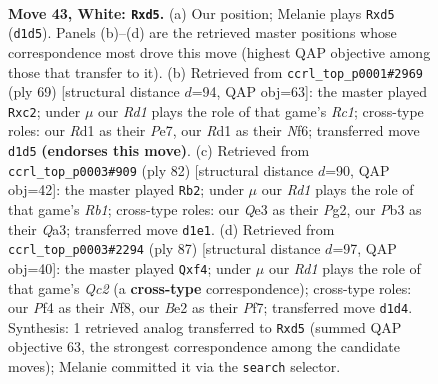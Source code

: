 \documentclass[11pt]{article}
\begin{document}
\clearpage

\begin{figure}[p]\centering
\begin{subfigure}{0.46\textwidth}\centering
\resizebox{\linewidth}{!}{%
\newchessgame
\chessboard[
  setfen={rnb2q2/1p4k1/4p3/p2r1pNp/PnN2P2/1P2Q1P1/4B1KP/3R3R w - - 5 43},
  showmover=false,
  pgfstyle=straightmove, color=movearrow, markmove={d1-d5}
]}
\caption{}
\end{subfigure}\hfill
\begin{subfigure}{0.46\textwidth}\centering
\resizebox{\linewidth}{!}{%
\newchessgame
\chessboard[
  setfen={2r1r3/3bp1k1/q2p1np1/1p1N3p/1P2P3/P5PP/2RQ2BK/2R5 b - - 1 35},
  showmover=false,
  pgfstyle=straightmove, color=movearrow, markmove={c8-c2}
]}
\caption{}
\end{subfigure}
\\[4pt]
\begin{subfigure}{0.46\textwidth}\centering
\resizebox{\linewidth}{!}{%
\newchessgame
\chessboard[
  setfen={1r1r2k1/p2q1p2/2b1n1p1/P2p4/2pP3p/Q1N1P2P/2B2PP1/1R2R1K1 w - - 5 42},
  showmover=false,
  pgfstyle=straightmove, color=movearrow, markmove={b1-b2}
]}
\caption{}
\end{subfigure}\hfill
\begin{subfigure}{0.46\textwidth}\centering
\resizebox{\linewidth}{!}{%
\newchessgame
\chessboard[
  setfen={1r1r1nk1/p1q2p2/Pp3bp1/1B1R2Np/2P1PQ1P/6P1/6K1/3R4 b - - 0 44},
  showmover=false,
  pgfstyle=straightmove, color=movearrow, markmove={c7-f4}
]}
\caption{}
\end{subfigure}
\caption{\textbf{Move 43, White: \texttt{Rxd5}.} (a) Our position; Melanie plays \texttt{Rxd5} (\texttt{d1d5}). Panels (b)--(d) are the retrieved master positions whose correspondence most drove this move (highest QAP objective among those that transfer to it). (b) Retrieved from \texttt{ccrl\_top\_p0001\#2969} (ply 69) [structural distance $d$=94, QAP obj=63]: the master played \texttt{Rxc2}; under $\mu$ our \emph{Rd1} plays the role of that game's \emph{Rc1}; cross-type roles: our \emph{R}d1 as their \emph{P}e7, our \emph{R}d1 as their \emph{N}f6; transferred move \texttt{d1d5} \textbf{(endorses this move)}. (c) Retrieved from \texttt{ccrl\_top\_p0003\#909} (ply 82) [structural distance $d$=90, QAP obj=42]: the master played \texttt{Rb2}; under $\mu$ our \emph{Rd1} plays the role of that game's \emph{Rb1}; cross-type roles: our \emph{Q}e3 as their \emph{P}g2, our \emph{P}b3 as their \emph{Q}a3; transferred move \texttt{d1e1}. (d) Retrieved from \texttt{ccrl\_top\_p0003\#2294} (ply 87) [structural distance $d$=97, QAP obj=40]: the master played \texttt{Qxf4}; under $\mu$ our \emph{Rd1} plays the role of that game's \emph{Qc2} (a \textbf{cross-type} correspondence); cross-type roles: our \emph{P}f4 as their \emph{N}f8, our \emph{B}e2 as their \emph{P}f7; transferred move \texttt{d1d4}. Synthesis: 1 retrieved analog transferred to \texttt{Rxd5} (summed QAP objective 63, the strongest correspondence among the candidate moves); Melanie committed it via the \texttt{search} selector.}
\label{fig:thought-m84}
\end{figure}
\end{document}
